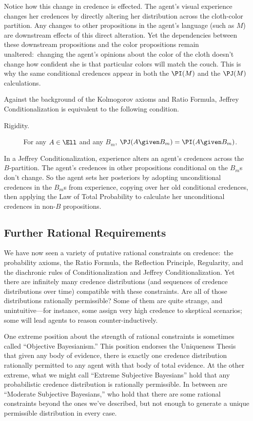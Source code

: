 Notice how this change in credence is effected. The agent's visual experience changes her credences by directly altering her distribution across the cloth-color partition. Any changes to other propositions in the agent's language (such as $M$) are downstream effects of this direct alteration. Yet the dependencies between these downstream propositions and the color propositions remain unaltered:\ changing the agent's opinions about the color of the cloth doesn't change how confident she is that particular colors will match the couch. This is why the same conditional credences appear in both the $\PI(M)$ and the $\PJ(M)$ calculations.

Against the background of the Kolmogorov axioms and Ratio Formula, Jeffrey Conditionalization is equivalent to the following condition.
\begin{description}
\item[Rigidity.\,]{For any $A \in \Ell$ and any $B_m$, $\PJ(A \given B_m)=\PI(A \given B_m)$.}
\end{description}
In a Jeffrey Conditionalization, experience alters an agent's credences across the $B$-partition. The agent's credences in other propositions conditional on the $B_m$s don't change. So the agent sets her posteriors by adopting unconditional credences in the $B_m$s from experience, copying over her old conditional credences, then applying the Law of Total Probability to calculate her unconditional credences in non-$B$ propositions.

\subsection{Further Rational Requirements} \label{ss:further}
We have now seen a variety of putative rational constraints on credence:\ the probability axioms, the Ratio Formula, the Reflection Principle, Regularity, and the diachronic rules of Conditionalization and Jeffrey Conditionalization. Yet there are infinitely many credence distributions (and sequences of credence distributions over time) compatible with these constraints. Are all of those distributions rationally permissible?
Some of them are quite strange, and unintuitive---for instance, some assign very high credence to skeptical scenarios; some will lead agents to reason counter-inductively.

One extreme position about the strength of rational constraints is sometimes called ``Objective Bayesianism.'' This position endorses the Uniqueness Thesis \citep{FeldmanDisagreements,WhitePermissiveness} that given any body of evidence, there is exactly one credence distribution rationally permitted to any agent with that body of total evidence. At the other extreme, what we might call ``Extreme Subjective Bayesians'' hold that any probabilistic credence distribution is rationally permissible. In between are ``Moderate Subjective Bayesians,'' who hold that there are some rational constraints beyond the ones we've described, but not enough to generate a unique permissible distribution in every case.

